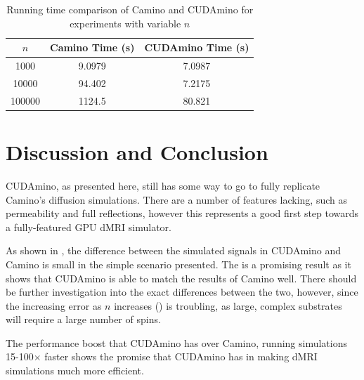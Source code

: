 \begin{table}
  \centering
  \begin{tabular}{|c|c|c|}
    \hline
    $n$ & Camino Time (s) & CUDAmino Time (s)\\\hline
    1000 & 9.0979 &7.0987 \\
    10000 & 94.402 &7.2175\\
    100000 & 1124.5 &80.821\\\hline
  \end{tabular}
  \caption{Running time comparison of Camino and CUDAmino for experiments with variable $n$}
  \label{tab:cyl_nspin_time}
\end{table}




\section{Discussion and Conclusion}
\label{sec:cudamino_discussion}

CUDAmino, as presented here, still has some way to go to fully replicate Camino's diffusion simulations.
There are a number of features lacking, such as permeability and full reflections, however this represents a good first step towards a fully-featured GPU \ac{dMRI} simulator.

As shown in , the difference between the simulated signals in CUDAmino and Camino is small in the simple scenario presented.
The is a promising result as it shows that CUDAmino is able to match the results of Camino well. There should be further investigation into the exact differences between the two, however, since the increasing error as $n$ increases () is troubling, as large, complex substrates will require a large number of spins.  

The performance boost that CUDAmino has over Camino, running simulations 15-100$\times$ faster shows the promise that CUDAmino has in making \ac{dMRI} simulations much more efficient. 

